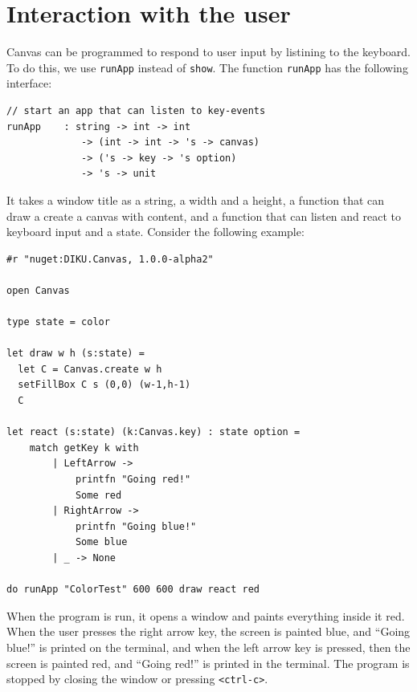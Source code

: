\documentclass{article}
\begin{document}
\section{Interaction with the user}
Canvas can be programmed to respond to user input by listining to the keyboard. To do this, we use \lstinline{runApp} instead of \lstinline{show}. The function \lstinline{runApp} has the following interface:
\begin{lstlisting}
// start an app that can listen to key-events
runApp    : string -> int -> int
             -> (int -> int -> 's -> canvas)
             -> ('s -> key -> 's option)
             -> 's -> unit
\end{lstlisting}
It takes a window title as a string, a width and a height, a function that can draw a create a canvas with content, and a function that can listen and react to keyboard input and a state. Consider the following example:
\begin{lstlisting}
#r "nuget:DIKU.Canvas, 1.0.0-alpha2"

open Canvas

type state = color

let draw w h (s:state) =
  let C = Canvas.create w h
  setFillBox C s (0,0) (w-1,h-1)
  C

let react (s:state) (k:Canvas.key) : state option =
    match getKey k with
        | LeftArrow ->
            printfn "Going red!"
            Some red
        | RightArrow ->
            printfn "Going blue!"
            Some blue
        | _ -> None

do runApp "ColorTest" 600 600 draw react red
\end{lstlisting}
When the program is run, it opens a window and paints everything inside it red. When the user presses the right arrow key, the screen is painted blue, and ``Going blue!'' is printed on the terminal, and when the left arrow key is pressed, then the screen is painted red, and ``Going red!'' is printed in the terminal. The program is stopped by closing the window or pressing \texttt{<ctrl-c>}.
\end{document}
